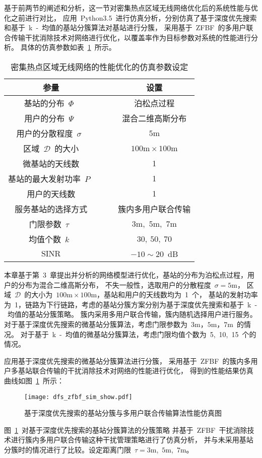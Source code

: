 基于前两节的阐述和分析，这一节对密集热点区域无线网络优化后的系统性能与优化之前进行对比，
应用~Python3.5~进行仿真分析，分别仿真了基于深度优先搜索和基于~k~-~均值的基站分簇算法对基站进行分簇，
采用基于~ZFBF~的多用户联合传输干扰消除技术对网络进行优化，以覆盖率作为目标参数对系统的性能进行分析。
具体的仿真参数如表~\ref{cluster_zfbf_sim_para}~所示。
\begin{table}[htbp]
\caption{密集热点区域无线网络的性能优化的仿真参数设定}
\label{cluster_zfbf_sim_para}
\vspace{0.5em}\centering\wuhao
\begin{tabular}{cccc}
\toprule[1.5pt]
参量 & & & 设置 \\
\midrule[0.5pt]
基站的分布~$\Phi$~ & & & 泊松点过程 \\
用户的分布~$\Psi$~  & & & 混合二维高斯分布\\
用户的分散程度~$\sigma$~ & & &  ~$5\mathrm{m}$~ \\
区域~$\mathcal{D}$~的大小  & & & ~$100\mathrm{m} \times 100 \mathrm{m}$~ \\
微基站的天线数 & & & 1 \\
基站的最大发射功率~$P$~ & & & 1 \\
用户的天线数 & & & 1 \\
服务基站的选择方式 & & & 簇内多用户联合传输 \\
门限参数~$\tau$~ & & & ~$3\mathrm{m}$,~$5\mathrm{m}$,~$7\mathrm{m}$~ \\
均值个数~$k$~ & & & ~$30,~50,~70$~ \\
$\mathrm{SINR}$ & & & $-10 \sim 20$~dB \\
\bottomrule[1.5pt]
\end{tabular}
\end{table}

本章基于第~3~章提出并分析的网络模型进行优化，基站的分布为泊松点过程，用户的分布为混合二维高斯分布，
不失一般性，选取用户的分散程度~$\sigma = 5 \mathrm{m}$，
区域~$\mathcal{D}$~的大小为~$100\mathrm{m} \times 100 \mathrm{m}$，基站和用户的天线数均为~1~个，
基站的发射功率为~1，链路为下行链路，考虑的基站分簇方案分别为基于深度优先搜索和基于~k~-~均值的基站分簇策略。
簇内采用多用户联合传输，簇内随机选择用户进行服务。
对于基于深度优先搜索的微基站分簇算法，考虑门限参数为~$3\mathrm{m}$，$5\mathrm{m}$，$7\mathrm{m}$~的情况。
对于基于~k~-~均值的微基站分簇算法，考虑门限均值个数为~5,~10,~15~个的情况。

应用基于深度优先搜索的微基站分簇算法进行分簇，
采用基于~ZFBF~的簇内多用户多基站联合传输的干扰消除技术对网络的性能进行优化，
得到的性能结果仿真曲线如图~\ref{dfs_zfbf_sim_show}~所示：
\begin{figure}[htbp]
\centering
\texttt{[image: dfs\_zfbf\_sim\_show.pdf]}
\caption{基于深度优先搜索的基站分簇与多用户联合传输算法性能仿真图}\vspace{-0.5em}
\label{dfs_zfbf_sim_show}
\end{figure}
图~\ref{dfs_zfbf_sim_show}~对基于深度优先搜索的基站分簇算法的分簇策略
并基于~ZFBF~干扰消除技术进行簇内多用户联合传输这种干扰管理策略进行了仿真分析，
并与未采用基站分簇时的情况进行了比较。设定距离门限~$\tau=3\mathrm{m}$,~$5\mathrm{m}$,~$7\mathrm{m}$。

